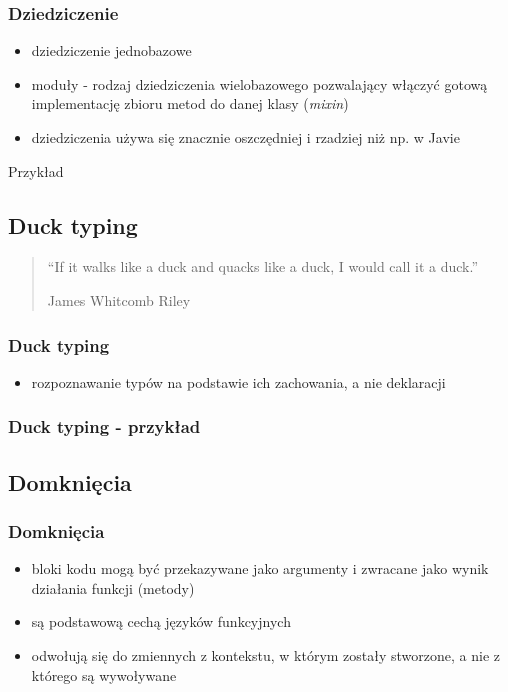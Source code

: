 \documentclass[12t]{beamer}
\begin{document}
\begin{frame}[fragile]
  \frametitle{Dziedziczenie}
  \begin{itemize}
  \item dziedziczenie jednobazowe
  \item moduły - rodzaj dziedziczenia wielobazowego pozwalający
    włączyć gotową implementację zbioru metod do danej klasy
    (\emph{mixin})
  \item dziedziczenia używa się znacznie oszczędniej i rzadziej niż
    np. w Javie
  \end{itemize}
  \begin{block}{Przykład}
    
  \end{block}
\end{frame}

\subsection{Duck typing}
\begin{frame}
  \begin{quote}
    “If it walks like a duck and quacks like a duck, I would call it a
    duck.”

    \hfill James Whitcomb Riley
  \end{quote}
\end{frame}

\begin{frame}
  \frametitle{Duck typing}
  \begin{itemize}
  \item rozpoznawanie typów na podstawie ich zachowania, a nie deklaracji
  \end{itemize}
\end{frame}

\begin{frame}
  \frametitle{Duck typing - przykład}
 \begin{footnotesize}
    
  \end{footnotesize}
\end{frame}

\subsection{Domknięcia}
\begin{frame}
  \frametitle{Domknięcia}
  \begin{itemize}
  \item bloki kodu mogą być przekazywane jako argumenty i zwracane
    jako wynik działania funkcji (metody)
  \item są podstawową cechą języków funkcyjnych
  \item odwołują się do zmiennych z kontekstu, w którym zostały
    stworzone, a nie z którego są wywoływane
  \end{itemize}
\end{frame}
\end{document}
